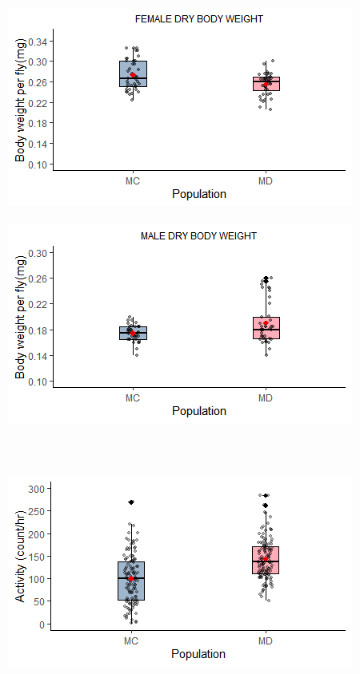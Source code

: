 \documentclass[12pt,onecolumn,twoside]{article}
\begin{document}
	\begin{figure}
		\centering
		\begin{subfigure}{0.49\textwidth}
			\includegraphics[width=\textwidth, keepaspectratio]{fig1c.png}
			\subcaption{\empty}
		\end{subfigure}
		\begin{subfigure}{0.49\textwidth}
			\includegraphics[width=\textwidth, keepaspectratio]{fig1d.png}
			\subcaption{\empty}
		\end{subfigure}\\
		\begin{subfigure}{0.49\textwidth}
			\includegraphics[width=\textwidth, keepaspectratio]{fig1e.png}

\end{subfigure}
\end{figure}
\end{document}
